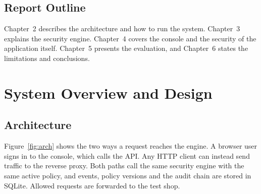 \documentclass{FastFyp}
\begin{document}
\section{Report Outline}
Chapter~2 describes the architecture and how to run the system. Chapter~3 explains the security engine. Chapter~4 covers the console and the security of the application itself. Chapter~5 presents the evaluation, and Chapter~6 states the limitations and conclusions.

\chapter{System Overview and Design}
\section{Architecture}
Figure~\ref{fig:arch} shows the two ways a request reaches the engine. A browser user signs in to the console, which calls the API. Any HTTP client can instead send traffic to the reverse proxy. Both paths call the same security engine with the same active policy, and events, policy versions and the audit chain are stored in SQLite. Allowed requests are forwarded to the test shop.
\end{document}
